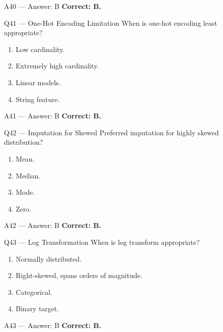\documentclass[aspectratio=169,9pt]{beamer}
\begin{document}
	\begin{frame}{A40 — Answer: B}
		\textbf{Correct: B.}
	\end{frame}
	
	\begin{frame}{Q41 — One-Hot Encoding Limitation}
		When is one-hot encoding least appropriate?
		\begin{enumerate}[label=\Alph*.]
			\item Low cardinality.
			\item Extremely high cardinality.
			\item Linear models.
			\item String feature.
		\end{enumerate}
	\end{frame}
	
	\begin{frame}{A41 — Answer: B}
		\textbf{Correct: B.}
	\end{frame}
	
	\begin{frame}{Q42 — Imputation for Skewed}
		Preferred imputation for highly skewed distribution?
		\begin{enumerate}[label=\Alph*.]
			\item Mean.
			\item Median.
			\item Mode.
			\item Zero.
		\end{enumerate}
	\end{frame}
	
	\begin{frame}{A42 — Answer: B}
		\textbf{Correct: B.}
	\end{frame}
	
	\begin{frame}{Q43 — Log Transformation}
		When is log transform appropriate?
		\begin{enumerate}[label=\Alph*.]
			\item Normally distributed.
			\item Right-skewed, spans orders of magnitude.
			\item Categorical.
			\item Binary target.
		\end{enumerate}
	\end{frame}
	
	\begin{frame}{A43 — Answer: B}
		\textbf{Correct: B.}
	\end{frame}
	
\end{document}
